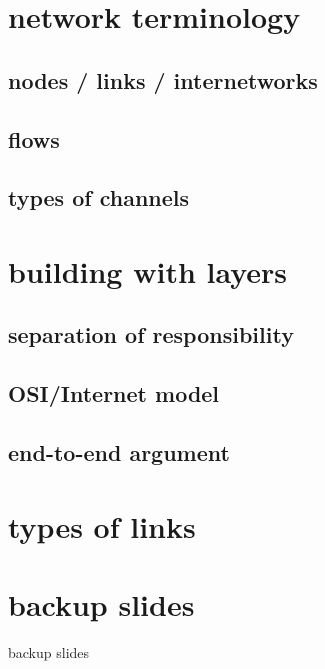 \date{}
\title{}
\date{}

\begin{frame}
    \titlepage
\end{frame}

\section{network terminology}

\subsection{nodes / links / internetworks}



\subsection{flows}



\subsection{types of channels}



\section{building with layers}

\subsection{separation of responsibility}



\subsection{OSI/Internet model}



\subsection{end-to-end argument}

\section{types of links}



\section{backup slides}
\begin{frame}{backup slides}
\end{frame}


